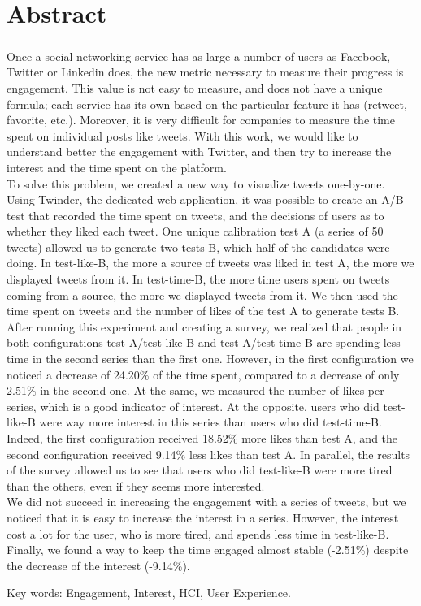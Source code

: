 \cleardoublepage
\chapter*{Abstract}

\paragraph{}
Once a social networking service has as large a number of users as Facebook, Twitter or Linkedin does, the new metric necessary to measure their progress is engagement. This value is not easy to measure, and does not have a unique formula; each service has its own based on the particular feature it has (retweet, favorite, etc.). Moreover, it is very difficult for companies to measure the time spent on individual posts like tweets. With this work, we would like to understand better the engagement with Twitter, and then try to increase the interest and the time spent on the platform. \\
To solve this problem, we created a new way to visualize tweets one-by-one. Using Twinder, the dedicated web application, it was possible to create an A/B test that recorded the time spent on tweets, and the decisions of users as to whether they liked each tweet. One unique calibration test A (a series of 50 tweets) allowed us to generate two tests B, which half of the candidates were doing. In test-like-B, the more a source of tweets was liked in test A, the more we displayed tweets from it. In test-time-B, the more time users spent on tweets coming from a source, the more we displayed tweets from it. We then used the time spent on tweets and the number of likes of the test A to generate tests B. After running this experiment and creating a survey, we realized that people in both configurations test-A/test-like-B and test-A/test-time-B are spending less time in the second series than the first one. However, in the first configuration we noticed a decrease of 24.20\% of the time spent, compared to a decrease of only 2.51\% in the second one. At the same, we measured the number of likes per series, which is a good indicator of interest. At the opposite, users who did test-like-B were way more interest in this series than users who did test-time-B. Indeed, the first configuration received 18.52\% more likes than test A, and the second configuration received 9.14\% less likes than test A. In parallel, the results of the survey allowed us to see that users who did test-like-B were more tired than the others, even if they seems more interested. \\
We did not succeed in increasing the engagement with a series of tweets, but we noticed that it is easy to increase the interest in a series. However, the interest cost a lot for the user, who is more tired, and spends less time in test-like-B. Finally, we found a way to keep the time engaged almost stable (-2.51\%) despite the decrease of the interest (-9.14\%).

\vskip0.5cm
Key words: Engagement, Interest, HCI, User Experience.

